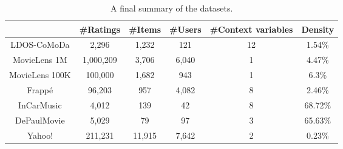 \begin{table*}[!htb]
    \centering
    \begin{tabular}{|c|c|c|c|c|c|} 
    \hline
               & \#Ratings & \#Items & \#Users & \#Context variables & Density  \\ 
    \hline
    LDOS-CoMoDa    & 2,296      & 1,232    & 121     & 12 & 1.54\%                 \\ 
    \hline
    MovieLens 1M   & 1,000,209 & 3,706    & 6,040    & 1 & 4.47\%                  \\ 
    \hline
    MovieLens 100K & 100,000   & 1,682    & 943     & 1 & 6.3\%                  \\ 
    \hline
    Frappé         & 96,203     & 957     & 4,082    & 8 & 2.46\%                  \\ 
    \hline
    InCarMusic     & 4,012      & 139     & 42      & 8 & 68.72\%                  \\ 
    \hline
    DePaulMovie    & 5,029      & 79      & 97      & 3 & 65.63\%                  \\
    \hline
    Yahoo!    & 211,231      & 11,915      & 7,642      & 2 & 0.23\%                  \\
    \hline
    \end{tabular}
    \caption{A final summary of the datasets.}
    \label{tab:datasetstats}
\end{table*}
